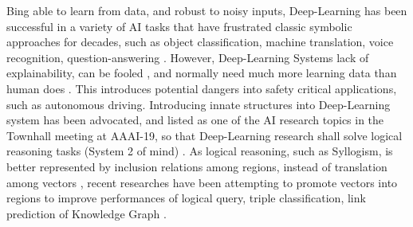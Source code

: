 \documentclass[runningheads]{llncs}
\begin{document}
 Bing able to learn from data, and robust to noisy inputs, Deep-Learning has been successful in a variety of AI tasks that have frustrated classic symbolic approaches for decades, such as object classification, machine translation, voice recognition, question-answering \cite{LeCunNature15}. However, Deep-Learning  Systems lack of explainability, can be fooled \cite{BiDAF16,JiaLiangaL17,Belinkov17}, and normally need much more learning data than human does \cite{tenenbaum15}. This introduces potential dangers into safety critical applications, such as autonomous driving. Introducing innate structures into Deep-Learning system has been advocated, and listed as one of the AI research topics in the Townhall meeting at AAAI-19, so that Deep-Learning research shall solve logical reasoning tasks (System 2 of mind) \cite{Kahneman11,benjio19}. As logical reasoning, such as Syllogism, is better represented by inclusion relations among regions, instead of translation among vectors \cite{Venn1880,diagram95}, recent researches have been attempting to promote vectors into regions to improve performances of logical query, triple classification, link prediction of Knowledge Graph \cite{dong19iclr,dong19,li2019smoothing,JuanziEmnlp18,ren2020}.   


\end{document}
